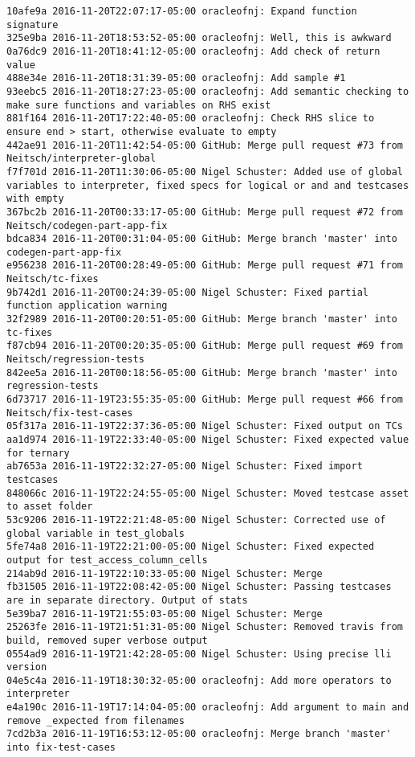 \begin{lstlisting}
10afe9a 2016-11-20T22:07:17-05:00 oracleofnj: Expand function signature
325e9ba 2016-11-20T18:53:52-05:00 oracleofnj: Well, this is awkward
0a76dc9 2016-11-20T18:41:12-05:00 oracleofnj: Add check of return value
488e34e 2016-11-20T18:31:39-05:00 oracleofnj: Add sample #1
93eebc5 2016-11-20T18:27:23-05:00 oracleofnj: Add semantic checking to make sure functions and variables on RHS exist
881f164 2016-11-20T17:22:40-05:00 oracleofnj: Check RHS slice to ensure end > start, otherwise evaluate to empty
442ae91 2016-11-20T11:42:54-05:00 GitHub: Merge pull request #73 from Neitsch/interpreter-global
f7f701d 2016-11-20T11:30:06-05:00 Nigel Schuster: Added use of global variables to interpreter, fixed specs for logical or and and testcases with empty
367bc2b 2016-11-20T00:33:17-05:00 GitHub: Merge pull request #72 from Neitsch/codegen-part-app-fix
bdca834 2016-11-20T00:31:04-05:00 GitHub: Merge branch 'master' into codegen-part-app-fix
e956238 2016-11-20T00:28:49-05:00 GitHub: Merge pull request #71 from Neitsch/tc-fixes
9b742d1 2016-11-20T00:24:39-05:00 Nigel Schuster: Fixed partial function application warning
32f2989 2016-11-20T00:20:51-05:00 GitHub: Merge branch 'master' into tc-fixes
f87cb94 2016-11-20T00:20:35-05:00 GitHub: Merge pull request #69 from Neitsch/regression-tests
842ee5a 2016-11-20T00:18:56-05:00 GitHub: Merge branch 'master' into regression-tests
6d73717 2016-11-19T23:55:35-05:00 GitHub: Merge pull request #66 from Neitsch/fix-test-cases
05f317a 2016-11-19T22:37:36-05:00 Nigel Schuster: Fixed output on TCs
aa1d974 2016-11-19T22:33:40-05:00 Nigel Schuster: Fixed expected value for ternary
ab7653a 2016-11-19T22:32:27-05:00 Nigel Schuster: Fixed import testcases
848066c 2016-11-19T22:24:55-05:00 Nigel Schuster: Moved testcase asset to asset folder
53c9206 2016-11-19T22:21:48-05:00 Nigel Schuster: Corrected use of global variable in test_globals
5fe74a8 2016-11-19T22:21:00-05:00 Nigel Schuster: Fixed expected output for test_access_column_cells
214ab9d 2016-11-19T22:10:33-05:00 Nigel Schuster: Merge
fb31505 2016-11-19T22:08:42-05:00 Nigel Schuster: Passing testcases are in separate directory. Output of stats
5e39ba7 2016-11-19T21:55:03-05:00 Nigel Schuster: Merge
25263fe 2016-11-19T21:51:31-05:00 Nigel Schuster: Removed travis from build, removed super verbose output
0554ad9 2016-11-19T21:42:28-05:00 Nigel Schuster: Using precise lli version
04e5c4a 2016-11-19T18:30:32-05:00 oracleofnj: Add more operators to interpreter
e4a190c 2016-11-19T17:14:04-05:00 oracleofnj: Add argument to main and remove _expected from filenames
7cd2b3a 2016-11-19T16:53:12-05:00 oracleofnj: Merge branch 'master' into fix-test-cases

\end{lstlisting}
